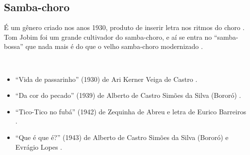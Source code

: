\subsection{Samba-choro}
É um gênero criado nos anos 1930, produto de inserir letra nos ritmos do choro \cite[pp. 291]{dourado2004dicionario}.
Tom Jobim foi um grande cultivador do samba-choro, 
e aí se entra no ``samba-bossa'' que nada mais é do que o velho samba-choro modernizado \cite[pp. 63]{reinato2010musica}.
\begin{example} ~

\begin{itemize}
\item ``Vida de passarinho'' (1930) de Ari Kerner Veiga de Castro  \cite[pp. 291]{dourado2004dicionario}.
\item ``Da cor do pecado'' (1939) de Alberto de Castro Simões da Silva (Bororó) \cite[pp. 105]{marcondes1977enciclopedia}.
\item ``Tico-Tico no fubá'' (1942) de Zequinha de Abreu e letra de Eurico Barreiros \cite[pp. 6]{marcondes1998enciclopedia} \cite[pp. 39,91]{diniz2003almanaque}.
\item ``Que é que é?''  (1943) de Alberto de Castro Simões da Silva (Bororó) e Evrágio Lopes \cite[pp. 105]{marcondes1977enciclopedia}.
\end{itemize}
\end{example}


